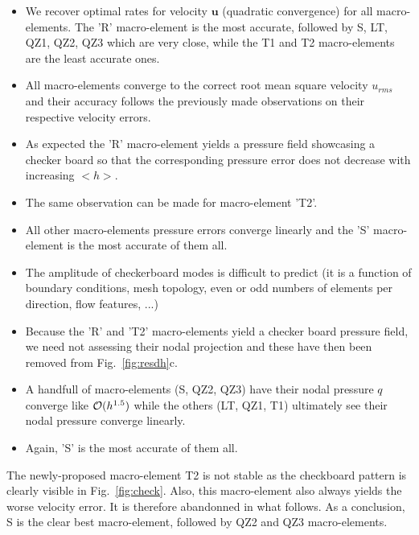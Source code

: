 \documentclass[a4paper]{article}
\begin{document}
\begin{itemize}

\item We recover optimal rates for velocity ${\bm u}$ (quadratic convergence) for all macro-elements.
The 'R' macro-element is the most accurate, followed by S, LT, QZ1, QZ2, QZ3 which are very close, 
while the T1 and T2 macro-elements are the least accurate ones. 
\item All macro-elements converge to the correct root mean square velocity $u_{rms}$ and 
their accuracy follows the previously made observations on their respective velocity errors.

\item As expected the 'R' macro-element yields a pressure field showcasing a checker board so that 
the corresponding pressure error does not decrease with increasing $<h>$. 
\item The same observation can be made for macro-element 'T2'. 
\item All other macro-elements pressure errors converge linearly and the 'S' macro-element is
the most accurate of them all.
\item The amplitude of checkerboard modes is difficult to predict (it is a function 
of boundary conditions, mesh topology, even or odd numbers of elements per direction, flow features, ...) \cite{XXX} 

\item Because the 'R' and 'T2' macro-elements yield a checker board pressure field, we need not
assessing their nodal projection and these have then been removed from Fig.~\ref{fig:resdh}c.
\item A handfull of macro-elements (S, QZ2, QZ3) have their nodal pressure $q$ converge like ${\cal O}(h^{1.5})$
while the others (LT, QZ1, T1) ultimately see their nodal pressure converge linearly.
\item Again, 'S' is the most accurate of them all.

\end{itemize}


The newly-proposed macro-element T2 is not stable as the checkboard pattern is clearly visible in Fig.~\ref{fig:check}. 
Also, this macro-element also always yields the worse velocity error. It is therefore abandonned in what follows. 
As a conclusion, S is the clear best macro-element, followed by QZ2 and QZ3 macro-elements.
\end{document}
